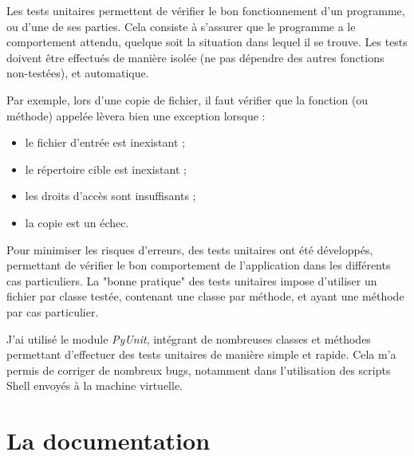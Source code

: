 Les tests unitaires permettent de vérifier le bon fonctionnement d'un programme, ou d'une de ses parties.
Cela consiste à s'assurer que le programme a le comportement attendu, quelque soit la situation dans lequel il se trouve.
Les tests doivent être effectués de manière isolée (ne pas dépendre des autres fonctions non-testées), et automatique.

Par exemple, lors d'une copie de fichier, il faut vérifier que la fonction (ou méthode) appelée lèvera bien une exception lorsque :
\begin{itemize}
	\item le fichier d'entrée est inexistant ;
	\item le répertoire cible est inexistant ;
	\item les droits d'accès sont insuffisants ;
	\item la copie est un échec.
\\
\end{itemize}


Pour minimiser les risques d'erreurs, des tests unitaires ont été développés, permettant de vérifier le bon comportement de l'application dans les différents cas particuliers.
La "bonne pratique" des tests unitaires impose d'utiliser un fichier par classe testée, contenant une classe par méthode, et ayant une méthode par cas particulier.

J'ai utilisé le module \textit{PyUnit}, intégrant de nombreuses classes et méthodes permettant d'effectuer des tests unitaires de manière simple et rapide.
Cela m'a permis de corriger de nombreux bugs, notamment dans l'utilisation des scripts Shell envoyés à la machine virtuelle.
\\






\section{La documentation}

